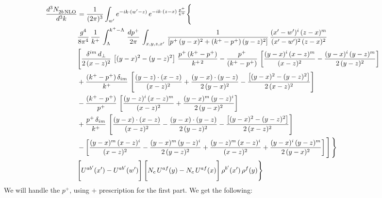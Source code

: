 \documentclass[9pt]{article}
\numberwithin{equation}{section}
\begin{document}
\begin{align}
 \frac{d^{3}N_{2b\,\rm NLO}^{\rm}}{d^{3}k}  & =   \frac{1}{(2\pi)^{3}}  \int_{ w^\prime} e^{-ik\cdot(w'-z)}\,e^{-ik\cdot (z-x)\,\frac{p^{+}}{k^{+}}} \Bigg\{\notag \\ & \frac{g^{4}}{8\pi^{4}}\,\frac{1}{k^{+}}\,\int_{\Lambda}^{k^{+}-\Lambda}\, \frac{dp^{+}}{2\pi} \, \int_{x,y,z,x'}\,\frac{1}{\left[p^{+}\,(y-x)^{2}+(k^{+}-p^{+})\,(y-z)^{2}\right]}\, \frac{(x'-w')^{i}\,(z-x)^{m}}{(x'-w')^{2}\,(z-x)^{2}} \notag \\ & \Bigg[\frac{\delta^{im}\,d_{\perp}}{2\,(x-z)^{2}}\,\left[(y-x)^{2}-(y-z)^{2}\right]\,\frac{p^{+}\,(k^{+}-p^{+})}{k^{+\,2}}-\frac{p^{+}}{(k^{+}-p^{+})}\,\left[\frac{(y-x)^{i}\,(x-z)^{m}}{(x-z)^{2}}-\frac{(y-x)^{i}\,(y-z)^{m}}{2\,(y-z)^{2}}\right]\notag \\ & +\frac{(k^{+}-p^{+})\,\delta_{im}}{k^{+}}\,\left[\frac{(y-z)\cdot (x-z)}{(x-z)^{2}}+\frac{(y-x)\cdot (y-z)}{2\,(y-x)^{2}}-\frac{\left[(y-x)^{2}-(y-z)^{2}\right]}{2\,(x-z)^{2}}\right]\notag \\ & -\frac{(k^{+}-p^{+})}{p^{+}}\,\left[\frac{(y-z)^{i}\,(x-z)^{m}}{(x-z)^{2}}+\frac{(y-x)^{m}\,(y-z)^{i}}{2\,(y-x)^{2}}\right]\notag \\ & +\frac{p^{+}\,\delta_{im}}{k^{+}}\,\left[\frac{(y-x)\cdot (x-z)}{(x-z)^{2}}-\frac{(y-x)\cdot (y-z)}{2\,(y-z)^{2}}-\frac{\left[(y-x)^{2}-(y-z)^{2}\right]}{2\,(x-z)^{2}}\right]\notag \\ &-\left[\frac{(y-x)^{m}\,(x-z)^{i}}{(x-z)^{2}}-\frac{(y-x)^{m}\,(y-z)^{i}}{2\,(y-z)^{2}}+\frac{(y-z)^{m}\,(x-z)^{i}}{(x-z)^{2}}+\frac{(y-x)^{i}\,(y-z)^{m}}{2\,(y-x)^{2}}\right]\Bigg]\,\Bigg\} \notag \\ & \Bigg[U^{ab'}(x')-U^{ab'}(w')\Bigg]\,\Bigg[N_{c}\,U^{af}(y) -N_{c}\,U^{af}(x)\Bigg]\,\rho^{b'}(x')\,\rho^{f}(y)\Bigg\}
\end{align}
We will handle the $p^{+}$, using $+$ prescription for the first part. We get the following: 
\end{document}
